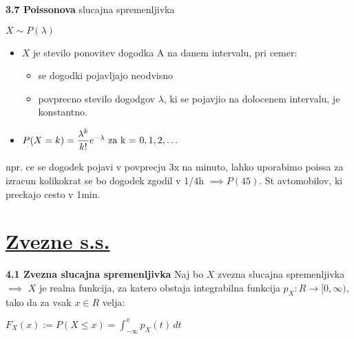 \documentclass{article}
\begin{document}
\begin{multicols}{2}
	\textbf{3.7 Poissonova} slucajna spremenljivka
	\begin{center}
		\begin{math}
			X \sim P(\lambda)
		\end{math}
	\end{center}
	\begin{itemize}
		\item $X$ je stevilo ponovitev dogodka A na danem intervalu, pri cemer:
		      \begin{itemize}
			      \item se dogodki pojavljajo neodvisno
			      \item povprecno stevilo dogodgov $\lambda$, ki se pojavjio na dolocenem intervalu, je konstantno.
		      \end{itemize}
		\item \begin{math}
			      P(X = k) =  \dfrac{ \lambda^{k} }{k!} e^{- \lambda}$ za k = $ 0,1,2,\dots
		      \end{math}
	\end{itemize}
	npr. ce se dogodek pojavi v povprecju 3x na minuto, lahko uporabimo poissa za izracun
	kolikokrat se bo dogodek zgodil v  1/4h $\implies P(45)$. St avtomobilov, ki preckajo cesto v 1min.

	\section{\underline{Zvezne s.s.}}

	\textbf{4.1 Zvezna slucajna spremenljivka}
	Naj bo $X$ zvezna slucajna spremenljivka $\implies$ $X$ je realna funkcija,
	za katero obstaja integrabilna funkcija $p_{X}: R \rightarrow [0, \infty)$,
	tako da za vsak $x \in R$ velja:

	\begin{center}
		\begin{math}
			F_{X}(x) := P(X \leq x) = \int_{- \infty}^{x} p_{X}(t) \,dt
		\end{math}
	\end{center}


\end{multicols}
\end{document}

